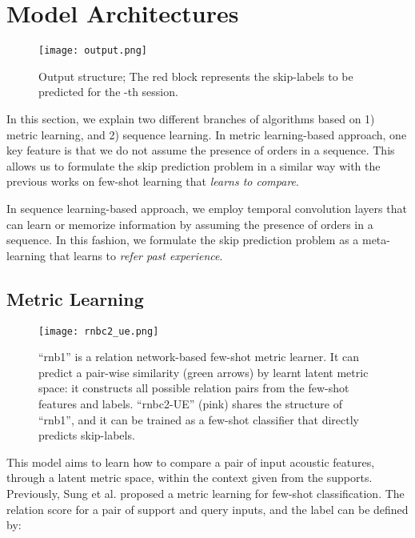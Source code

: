 \section{Model Architectures}
\begin{figure}
\texttt{[image: output.png]}
\caption{Output structure; The red block represents the skip-labels to be predicted for the -th session.}
\end{figure}
In this section, we explain two different branches of algorithms based on 1) metric learning, and 2) sequence learning.
In metric learning-based approach, one key feature is that we do not assume the presence of orders in a sequence. This allows us to formulate the skip prediction problem in a similar way with the previous  works\cite{sung2018learning} on few-shot learning that {\it learns to compare}.

In sequence learning-based approach, we employ temporal convolution layers that can learn or memorize information by assuming the presence of orders in a sequence. In this fashion, we formulate the skip prediction problem as a meta-learning\cite{snail} that learns to {\it refer past experience}.  

\subsection{Metric Learning}

\begin{figure}
\texttt{[image: rnbc2\_ue.png]}
\caption{``rnb1'' is a relation network-based few-shot metric learner. It can predict a pair-wise similarity (green arrows) by learnt latent metric space: it constructs  all possible relation pairs from the few-shot features and labels. ``rnbc2-UE'' (pink) shares the structure of ``rnb1'', and it can be trained as a few-shot classifier that directly predicts skip-labels.}
\label{rnbc2ue}
\end{figure}

This model aims to learn how to compare a pair of input acoustic features, through a latent metric space, within the context given from the supports. Previously, Sung et al.\cite{sung2018learning} proposed a metric learning for few-shot classification. The relation score  for a pair of support and query inputs,  and the label  can be defined by:

